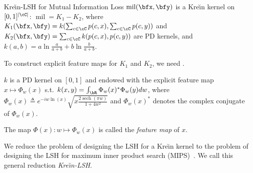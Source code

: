 \documentclass[final]{beamer}
\newcommand{\kr}{Kre\u{\i}n\xspace}
\DeclareMathOperator{\sech}{sech}
\DeclareMathOperator{\mil}{mil}
\newlength{\threecolwid}
\begin{document}
\begin{frame}[t]
\begin{columns}[t]
\begin{column}{\threecolwid}
\begin{block}{\kr-LSH for Mutual Information Loss}
 			 $ \mil(\bfx,\bfy) $ is a \kr kernel on 
 			$ 
 			[0,1]^{|\cC|} $: $ \mil=K_1-K_2 $,
 			 where $ 
 			K_1(\bfx,\bfy) = k(\sum_{c\in \cC}p(c,x), \sum_{c\in \cC}p(c,y)) $ 
 			and
 			 $ 
 			K_2(\bfx,\bfy)=\sum_{c\in \cC} k(p(c,x),p(c,y)) $ are PD kernels, 
 			and
 			$
 			k(a,b) = a\ln\frac{a}{a+b}+b\ln\frac{b}{a+b}
 			$.

 		
 		To construct explicit feature maps 
 		for $ K_1 $ and $ K_2 $, we need .
 		
 			 $ k $ is a PD kernel on $ [0,1] $ and 
 			 endowed with the explicit feature map $ x\mapsto \Phi_w(x) $ 
 			s.t.\ 
 			$ k(x,y) =  \int_\bR \Phi_w(x)^* \Phi_w(y) dw $, 
 			where $
 			\Phi_w(x) \triangleq e^{-iw\ln(x)}\sqrt{x\frac{2\sech(\pi 
 			w)}{1+4w^2}}$ and $ \Phi_w(x)^* $ denotes the complex conjugate of 
 			$ \Phi_w(x) $.

 		
 		The map $ \Phi(x):w\mapsto \Phi_w(x) $ is called the \emph{feature map} 
 		of $ x 
 		$. 
 		
 		
 		

 		We reduce the problem of designing the LSH for a \kr kernel to 
 		the problem of designing the LSH for maximum inner product search 
(MIPS)~\citep{shrivastava2014asymmetric,neyshabur2015symmetric,yan2018norm}.
 		We call this general reduction \emph{\kr-LSH}.
 		
 		

\end{block}
\end{column}
\end{columns}
\end{frame}
\end{document}
